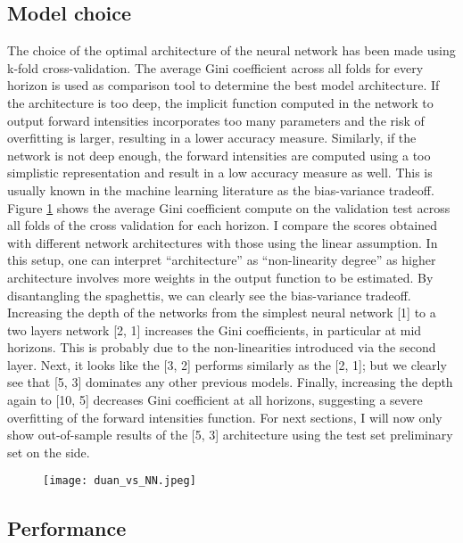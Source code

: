 \subsection{Model choice}
\label{sec4-1}


The choice of the optimal architecture of the neural network has been made using k-fold cross-validation. The average Gini coefficient across all folds for every horizon is used as comparison tool to determine the best model architecture. If the architecture is too deep, the implicit function computed in the network to output forward intensities incorporates too many parameters and the risk of overfitting is larger, resulting in a lower accuracy measure. Similarly, if the network is not deep enough, the forward intensities are computed using a too simplistic representation and result in a low accuracy measure as well. This is usually known in the machine learning literature as the bias-variance tradeoff. Figure \ref{fig:ginicomp} shows the average Gini coefficient compute on the validation test across all folds of the cross validation for each horizon. I compare the scores obtained with different network architectures with those using the linear assumption. In this setup, one can interpret ``architecture'' as ``non-linearity degree'' as higher architecture involves more weights in the output function to be estimated. By disantangling the spaghettis, we can clearly see the bias-variance tradeoff. Increasing the depth of the networks from the simplest neural network [1] to a two layers network [2, 1] increases the Gini coefficients, in particular at mid horizons. This is probably due to the non-linearities introduced via the second layer. Next, it looks like the [3, 2] performs similarly as the [2, 1]; but we clearly see that [5, 3] dominates any other previous models. Finally, increasing the depth again to [10, 5] decreases Gini coefficient at all horizons, suggesting a severe overfitting of the forward intensities function. For next sections, I will now only show out-of-sample results of the [5, 3] architecture using the test set preliminary set on the side. \\


\begin{figure}
    \centering
    \texttt{[image: duan\_vs\_NN.jpeg]}
    \label{fig:ginicomp}
\end{figure}


\subsection{Performance}
\label{sec4-2}


